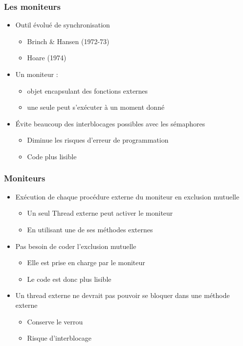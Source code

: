 \begin{frame}
\frametitle{Les moniteurs}
\begin{itemize}
\item <1-> Outil évolué de synchronisation
\begin{itemize}
\item Brinch \& Hansen (1972-73)
\item Hoare (1974)
\end{itemize}
\item <2-> Un moniteur :
\begin{itemize}
\item objet encapsulant des fonctions externes
\item une seule peut s’exécuter à un moment donné
\end{itemize}
\item <3-> Évite beaucoup des interblocages possibles avec les sémaphores
\begin{itemize}
\item Diminue les risques d'erreur de programmation
\item Code plus lisible
\end{itemize}
\end{itemize}
\end{frame}

\begin{frame}
\frametitle{Moniteurs}
\begin{itemize}
\item <1-> Exécution de chaque procédure externe du moniteur en exclusion mutuelle
\begin{itemize}
\item Un seul Thread externe peut activer le moniteur
\item En utilisant une de ses méthodes externes
\end{itemize}
\item <2-> Pas besoin de coder l’exclusion mutuelle
\begin{itemize}
\item Elle est prise en charge par le moniteur
\item Le code est donc plus lisible
\end{itemize}
\item <3-> Un thread externe ne devrait pas pouvoir se bloquer dans une méthode externe
\begin{itemize}
\item Conserve le verrou
\item Risque d'interblocage
\end{itemize}
\end{itemize}
\end{frame}

